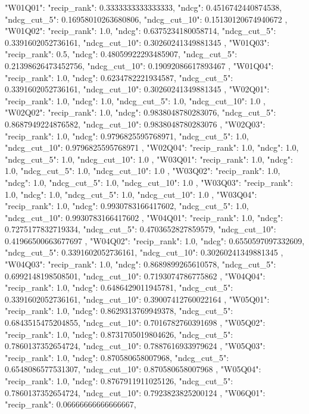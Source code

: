 {
 "W01Q01": {
  "recip_rank": 0.3333333333333333,
  "ndcg": 0.4516742440874538,
  "ndcg_cut_5": 0.16958010263680806,
  "ndcg_cut_10": 0.15130120674940672
 },
 "W01Q02": {
  "recip_rank": 1.0,
  "ndcg": 0.6375234180058714,
  "ndcg_cut_5": 0.3391602052736161,
  "ndcg_cut_10": 0.30260241349881345
 },
 "W01Q03": {
  "recip_rank": 0.5,
  "ndcg": 0.48059922293485907,
  "ndcg_cut_5": 0.21398626473452756,
  "ndcg_cut_10": 0.19092086617893467
 },
 "W01Q04": {
  "recip_rank": 1.0,
  "ndcg": 0.6234782221934587,
  "ndcg_cut_5": 0.3391602052736161,
  "ndcg_cut_10": 0.30260241349881345
 },
 "W02Q01": {
  "recip_rank": 1.0,
  "ndcg": 1.0,
  "ndcg_cut_5": 1.0,
  "ndcg_cut_10": 1.0
 },
 "W02Q02": {
  "recip_rank": 1.0,
  "ndcg": 0.9838048780283076,
  "ndcg_cut_5": 0.8687949224876582,
  "ndcg_cut_10": 0.9838048780283076
 },
 "W02Q03": {
  "recip_rank": 1.0,
  "ndcg": 0.9796825595768971,
  "ndcg_cut_5": 1.0,
  "ndcg_cut_10": 0.9796825595768971
 },
 "W02Q04": {
  "recip_rank": 1.0,
  "ndcg": 1.0,
  "ndcg_cut_5": 1.0,
  "ndcg_cut_10": 1.0
 },
 "W03Q01": {
  "recip_rank": 1.0,
  "ndcg": 1.0,
  "ndcg_cut_5": 1.0,
  "ndcg_cut_10": 1.0
 },
 "W03Q02": {
  "recip_rank": 1.0,
  "ndcg": 1.0,
  "ndcg_cut_5": 1.0,
  "ndcg_cut_10": 1.0
 },
 "W03Q03": {
  "recip_rank": 1.0,
  "ndcg": 1.0,
  "ndcg_cut_5": 1.0,
  "ndcg_cut_10": 1.0
 },
 "W03Q04": {
  "recip_rank": 1.0,
  "ndcg": 0.9930783166417602,
  "ndcg_cut_5": 1.0,
  "ndcg_cut_10": 0.9930783166417602
 },
 "W04Q01": {
  "recip_rank": 1.0,
  "ndcg": 0.7275177832719334,
  "ndcg_cut_5": 0.4703652827859579,
  "ndcg_cut_10": 0.41966500663677697
 },
 "W04Q02": {
  "recip_rank": 1.0,
  "ndcg": 0.6550597097332609,
  "ndcg_cut_5": 0.3391602052736161,
  "ndcg_cut_10": 0.30260241349881345
 },
 "W04Q03": {
  "recip_rank": 1.0,
  "ndcg": 0.8689899265610578,
  "ndcg_cut_5": 0.6992148198508501,
  "ndcg_cut_10": 0.7193074786775862
 },
 "W04Q04": {
  "recip_rank": 1.0,
  "ndcg": 0.6486429011945781,
  "ndcg_cut_5": 0.3391602052736161,
  "ndcg_cut_10": 0.39007412760022164
 },
 "W05Q01": {
  "recip_rank": 1.0,
  "ndcg": 0.8629313769949378,
  "ndcg_cut_5": 0.6843515475204855,
  "ndcg_cut_10": 0.7016782760391698
 },
 "W05Q02": {
  "recip_rank": 1.0,
  "ndcg": 0.8731705019804626,
  "ndcg_cut_5": 0.7860137352654724,
  "ndcg_cut_10": 0.7887616933979624
 },
 "W05Q03": {
  "recip_rank": 1.0,
  "ndcg": 0.870580658007968,
  "ndcg_cut_5": 0.6548086577531307,
  "ndcg_cut_10": 0.870580658007968
 },
 "W05Q04": {
  "recip_rank": 1.0,
  "ndcg": 0.8767911911025126,
  "ndcg_cut_5": 0.7860137352654724,
  "ndcg_cut_10": 0.7923823825200124
 },
 "W06Q01": {
  "recip_rank": 0.06666666666666667,
}}
